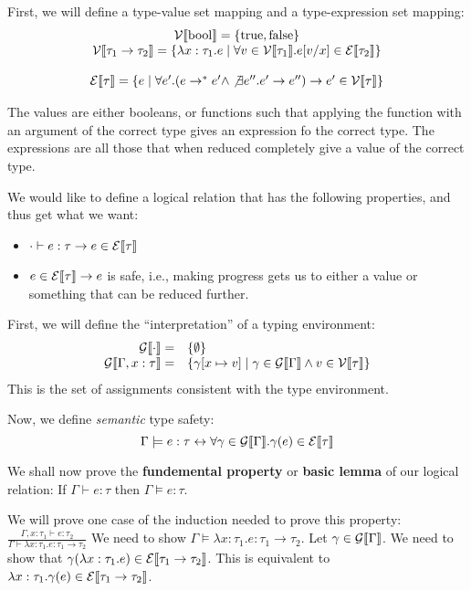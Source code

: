 First, we will define a type-value set mapping and a type-expression set mapping:
\[
\begin{array}{c}
\mathcal{V}\llbracket \mathrm{bool} \rrbracket = \{\mathrm{true, false}\} \\
\mathcal{V}\llbracket \tau_1 \to \tau_2 \rrbracket = 
\{\lambda x: \tau_1. e \mid \forall v \in \mathcal{V}\llbracket \tau_1 \rrbracket. e[v/x] \in \mathcal{E}\llbracket \tau_2 \rrbracket\} \\ 
\\
\mathcal{E}\llbracket \tau \rrbracket = \{e \mid \forall e'. (e \to^* e' \wedge \not\exists e''. e' \to e'') \to e' \in \mathcal{V}\llbracket \tau \rrbracket\}
\end{array}
\]

The values are either booleans, or functions such that applying the function with an argument of the correct type
gives an expression fo the correct type. The expressions are all those that when reduced completely give a value
of the correct type.

We would like to define a logical relation that has the following properties, and thus get what we want: 
\begin{itemize}
\item $\cdot \vdash e: \tau \to e \in \mathcal{E}\llbracket \tau \rrbracket$
\item $e\in \mathcal{E} \llbracket \tau \rrbracket \to e$ is safe, i.e., making progress gets us to either a 
value or something that can be reduced further.
\end{itemize}

First, we will define the ``interpretation'' of a typing environment:
\[
\begin{array}{rl}
\mathcal{G}\llbracket \cdot \rrbracket = & \{\emptyset\} \\
\mathcal{G}\llbracket \Gamma, x : \tau \rrbracket = & 
\{\gamma[x\mapsto v] \mid \gamma \in \mathcal{G}\llbracket \Gamma \rrbracket \wedge v\in \mathcal{V}\llbracket \tau \rrbracket\}
\end{array}
\]
This is the set of assignments consistent with the type environment.

Now, we define \emph{semantic} type safety:
\[
\Gamma \models e: \tau \leftrightarrow \forall \gamma \in \mathcal{G}\llbracket \Gamma \rrbracket. \gamma(e) \in \mathcal{E}\llbracket \tau \rrbracket
\]

We shall now prove the \textbf{fundemental property} or \textbf{basic lemma} of our logical relation: If 
$\Gamma \vdash e : \tau$ then $\Gamma \models e : \tau$.

We will prove one case of the induction needed to prove this property:
$\frac{\Gamma, x : \tau_1 \vdash e : \tau_2}{\Gamma \vdash \lambda x: \tau_1. e : \tau_1 \to \tau_2}$
We need to show $\Gamma \models \lambda x: \tau_1. e : \tau_1 \to \tau_2$. Let $\gamma \in \mathcal{G}\llbracket \Gamma \rrbracket$.
We need to show that $\gamma (\lambda x: \tau_1. e) \in \mathcal{E} \llbracket \tau_1 \to \tau_2 \rrbracket$. This is equivalent to
$\lambda x: \tau_1. \gamma(e) \in \mathcal{E} \llbracket \tau_1 \to \tau_2 \rrbracket$.

